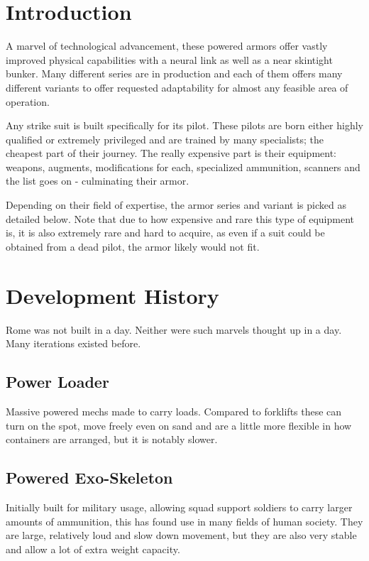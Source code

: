 \documentclass[12pt,a4paper,openany]{book}
\begin{document}
	

	\chapter{Introduction}
	A marvel of technological advancement, these powered armors offer vastly improved physical capabilities with a neural link as well as a near skintight bunker. Many different series are in production and each of them offers many different variants to offer requested adaptability for almost any feasible area of operation.\par
	Any strike suit is built specifically for its pilot. These pilots are born either highly qualified or extremely privileged and are trained by many specialists; the cheapest part of their journey. The really expensive part is their equipment: weapons, augments, modifications for each, specialized ammunition, scanners and the list goes on - culminating their armor.\par
	Depending on their field of expertise, the armor series and variant is picked as detailed below. Note that due to how expensive and rare this type of equipment is, it is also extremely rare and hard to acquire, as even if a suit could be obtained from a dead pilot, the armor likely would not fit.
	
	\chapter{Development History}
	Rome was not built in a day. Neither were such marvels thought up in a day. Many iterations existed before.
	\section*{Power Loader}
	Massive powered mechs made to carry loads. Compared to forklifts these can turn on the spot, move freely even on sand and are a little more flexible in how containers are arranged, but it is notably slower.
	\par
	\section*{Powered Exo-Skeleton}
	Initially built for military usage, allowing squad support soldiers to carry larger amounts of ammunition, this has found use in many fields of human society. They are large, relatively loud and slow down movement, but they are also very stable and allow a lot of extra weight capacity.
	\par
\end{document}
